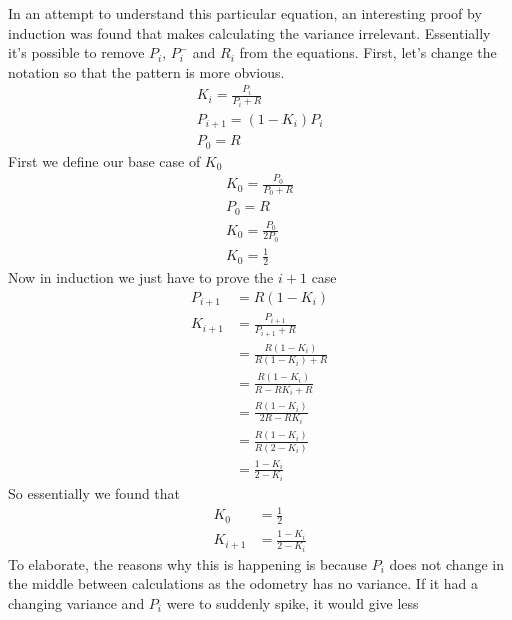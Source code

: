 \documentclass{article}
\newcommand\tab[1][1cm]{\hspace*{#1}}
\begin{document}
\tab In an attempt to understand this particular equation, an interesting proof
by induction was found that makes calculating the variance irrelevant.
Essentially it's possible to remove $P_i$,  $P_i^-$ and $R_i$ from the
equations. First, let's change the notation so that the pattern is more obvious.
\begin{equation*}
    \begin{split}
        K_i = \frac{P_i}{P_i + R} \\
        P_{i+1} = (1-K_i)P_i \\
        P_0 = R
    \end{split}
\end{equation*}
First we define our base case of $K_0$
\begin{equation*}
    \begin{split}
        K_0 = \frac{P_0}{P_0 + R} \\
        P_0 = R \\
        K_0 = \frac{P_0}{2P_0} \\
        K_0 = \frac{1}{2}
    \end{split}
\end{equation*}
Now in induction we just have to prove the $i+1$ case
\begin{equation*}
    \begin{split}
        P_{i+1} & = R(1-K_i) \\
        K_{i+1} & = \frac{P_{i+1}}{P_{i+1} + R} \\
         & = \frac{R(1-K_i)}{R(1-K_i)+R} \\
         & = \frac{R(1-K_i)}{R-RK_i+R} \\
         & = \frac{R(1-K_i)}{2R - RK_i} \\
         & = \frac{R(1-K_i)}{R(2-K_i)} \\
         & = \frac{1-K_i}{2-K_i}
    \end{split}
\end{equation*}
So essentially we found that
\begin{equation*}
    \begin{split}
        K_0 & = \frac{1}{2} \\
        K_{i+1} & = \frac{1-K_i}{2-K_i}
    \end{split}
\end{equation*}
\tab To elaborate, the reasons why this is happening is because $P_i$ does not
change in the middle between calculations as the odometry has no variance. If it
had a changing variance and $P_i$ were to suddenly spike, it would give less
\end{document}
